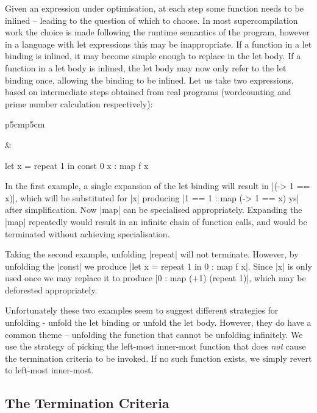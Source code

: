 \documentclass{llncs}
\begin{document}
Given an expression under optimisation, at each step some function needs to be inlined -- leading to the question of which to choose. In most supercompilation work the choice is made following the runtime semantics of the program, however in a language with let expressions this may be inappropriate. If a function in a let binding is inlined, it may become simple enough to replace in the let body. If a function in a let body is inlined, the let body may now only refer to the let binding once, allowing the binding to be inlined. Let us take two expressions, based on intermediate steps obtained from real programs (wordcounting and prime number calculation respectively):

\begin{tabular}{p{5cm}p{5cm}}
&
\begin{code}
let x = repeat 1
in const 0 x : map f x
\end{code}
\end{tabular}

In the first example, a single expansion of the let binding will result in |(\x -> 1 == x)|, which will be substituted for |x| producing |1 == 1 : map (\x -> 1 == x) ys| after simplification. Now |map| can be specialised appropriately. Expanding the |map| repeatedly would result in an infinite chain of function calls, and would be terminated without achieving specialisation.

Taking the second example, unfolding |repeat| will not terminate. However, by unfolding the |const| we produce |let x = repeat 1 in 0 : map f x|. Since |x| is only used once we may replace it to produce |0 : map (+1) (repeat 1)|, which may be deforested appropriately.

Unfortunately these two examples seem to suggest different strategies for unfolding - unfold the let binding or unfold the let body. However, they do have a common theme -- unfolding the function that cannot be unfolding infinitely. We use the strategy of picking the left-most inner-most function that does \textit{not} cause the termination criteria to be invoked. If no such function exists, we simply revert to left-most inner-most.

\subsection{The Termination Criteria}
\end{document}
